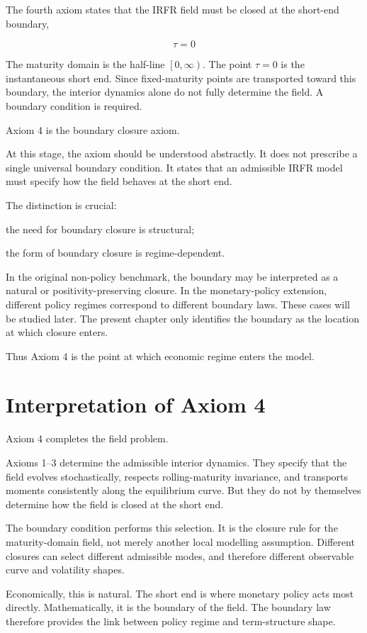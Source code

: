 \documentclass[11pt,oneside]{book}
\begin{document}
The fourth axiom states that the IRFR field must be closed at the
short-end boundary,

\[
\tau = 0
\]

The maturity domain is the half-line \(\left[0,\infty\right)\). The point $\tau=0$ is the
instantaneous short end. Since fixed-maturity points are transported
toward this boundary, the interior dynamics alone do not fully determine
the field. A boundary condition is required.

Axiom 4 is the boundary closure axiom.

At this stage, the axiom should be understood abstractly. It does not
prescribe a single universal boundary condition. It states that an
admissible IRFR model must specify how the field behaves at the short
end.

The distinction is crucial:

the need for boundary closure is structural;

the form of boundary closure is regime-dependent.

In the original non-policy benchmark, the boundary may be interpreted as
a natural or positivity-preserving closure. In the monetary-policy
extension, different policy regimes correspond to different boundary
laws. These cases will be studied later. The present chapter only
identifies the boundary as the location at which closure enters.

Thus Axiom 4 is the point at which economic regime enters the model.

\section{Interpretation of Axiom
4}\label{interpretation-of-axiom-4}

Axiom 4 completes the field problem.

Axioms 1--3 determine the admissible interior dynamics. They specify
that the field evolves stochastically, respects rolling-maturity
invariance, and transports moments consistently along the equilibrium
curve. But they do not by themselves determine how the field is closed
at the short end.

The boundary condition performs this selection. It is the closure rule
for the maturity-domain field, not merely another local modelling
assumption. Different closures can select different admissible modes,
and therefore different observable curve and volatility shapes.

Economically, this is natural. The short end is where monetary policy
acts most directly. Mathematically, it is the boundary of the field. The
boundary law therefore provides the link between policy regime and
term-structure shape.
\end{document}
